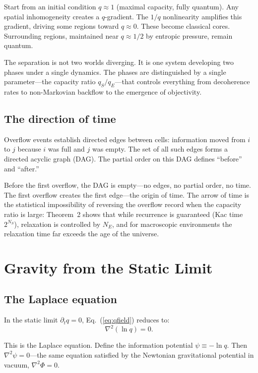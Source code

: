 \documentclass[12pt]{article}
\begin{document}
Start from an initial condition $q\approx 1$ (maximal capacity, fully quantum). Any spatial inhomogeneity creates a $q$-gradient. The $1/q$ nonlinearity amplifies this gradient, driving some regions toward $q\approx 0$. These become classical cores. Surrounding regions, maintained near $q\approx 1/2$ by entropic pressure, remain quantum.

The separation is not two worlds diverging. It is one system developing two phases under a single dynamics. The phases are distinguished by a single parameter---the capacity ratio $q_S/q_E$---that controls everything from decoherence rates to non-Markovian backflow to the emergence of objectivity.

\subsection{The direction of time}

Overflow events establish directed edges between cells: information moved from $i$ to $j$ because $i$ was full and $j$ was empty. The set of all such edges forms a directed acyclic graph (DAG). The partial order on this DAG defines ``before'' and ``after.''

Before the first overflow, the DAG is empty---no edges, no partial order, no time. The first overflow creates the first edge---the origin of time. The arrow of time is the statistical impossibility of reversing the overflow record when the capacity ratio is large: Theorem~2 shows that while recurrence is guaranteed (Kac time $2^{N_S}$), relaxation is controlled by $N_E$, and for macroscopic environments the relaxation time far exceeds the age of the universe.

\section{Gravity from the Static Limit}

\subsection{The Laplace equation}

In the static limit $\partial_t q=0$, Eq.~(\ref{eq:qfield}) reduces to:
\begin{equation}
\boxed{\nabla^2(\ln q) = 0}.
\label{eq:laplace}
\end{equation}

This is the Laplace equation. Define the information potential $\psi\equiv -\ln q$. Then $\nabla^2\psi=0$---the same equation satisfied by the Newtonian gravitational potential in vacuum, $\nabla^2\Phi=0$.
\end{document}
